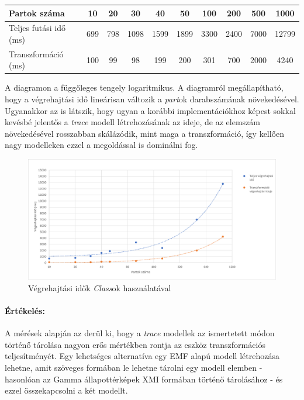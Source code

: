 \begin{center}
	\begin{tabular}{ l|c|c|c|c|c|c|c|c|c }
		Partok száma & 10 & 20 & 30 & 40 & 50 & 100 & 200 & 500 & 1000 \\
		\hline
		Teljes futási idő (ms) & 699 & 798 & 1098 & 1599 & 1899 & 3300 & 2400 & 7000 & 12799 \\
		\hline
		Transzformáció (ms) & 100 & 99 & 98 & 199 & 200 & 301 & 700 & 2000 & 4240\\
	\end{tabular}
\end{center}
\vskip 5mm
A diagramon a függőleges tengely logaritmikus. A diagramról megállapítható, hogy a végrehajtási idő lineárisan változik a \emph{part}ok darabszámának növekedésével. Ugyanakkor az is látszik, hogy ugyan a korábbi implementációkhoz képest sokkal kevésbé jelentős a \emph{trace} modell létrehozásának az ideje, de az elemszám növekedésével rosszabban skálázódik, mint maga a transzformáció, így kellően nagy modelleken ezzel a megoldással is dominálni fog.

\begin{figure}[!ht]
	\centering
	\includegraphics[width=12cm, keepaspectratio]{figures/evaluation/mes-2.png}
	\caption{Végrehajtási idők \emph{Class}ok használatával}
	\label{fig:mes-2}
\end{figure}

\paragraph{Értékelés:} A mérések alapján az derül ki, hogy a \emph{trace} modellek az ismertetett módon történő tárolása nagyon erős mértékben rontja az eszköz transzformációs teljesítményét. Egy lehetséges alternatíva egy EMF alapú modell létrehozása lehetne, amit szöveges formában le lehetne tárolni egy modell elemben - hasonlóan az Gamma állapottérképek XMI formában történő tárolásához - és ezzel összekapcsolni a két modellt.


